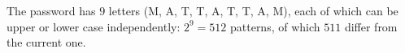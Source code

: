 The password has $9$ letters (M, A, T, T, A, T, T, A, M), each of which can be upper or lower case independently: $2^9=\boxed{512}$ patterns, of which $511$ differ from the current one.
